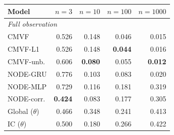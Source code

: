 \begin{tabular}{lrrrr}
\toprule
Model & $n{=}3$ & $n{=}10$ & $n{=}100$ & $n{=}1000$ \\
\midrule
\multicolumn{5}{l}{\emph{Full observation}} \\
CMVF & 0.526 & 0.148 & 0.046 & 0.015 \\
CMVF-L1 & 0.526 & 0.148 & \textbf{0.044} & 0.016 \\
CMVF-unb. & 0.606 & \textbf{0.080} & 0.055 & \textbf{0.012} \\
NODE-GRU & 0.776 & 0.103 & 0.083 & 0.020 \\
NODE-MLP & 0.729 & 0.116 & 0.181 & 0.319 \\
NODE-corr. & \textbf{0.424} & 0.083 & 0.177 & 0.305 \\
Global ($\theta$) & 0.466 & 0.348 & 0.241 & 0.413 \\
IC ($\theta$) & 0.500 & 0.180 & 0.266 & 0.422 \\
\bottomrule
\end{tabular}
